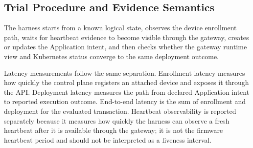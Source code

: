 \begingroup
\color{red}
\subsection{Trial Procedure and Evidence Semantics}
The harness starts from a known logical state, observes the device enrollment path, waits for heartbeat evidence to become visible through the gateway, creates or updates the Application intent, and then checks whether the gateway runtime view and Kubernetes status converge to the same deployment outcome.


Latency measurements follow the same separation. Enrollment latency measures how quickly the control plane registers an attached device and exposes it through the API.  Deployment latency measures the path from declared Application intent to reported execution outcome. End-to-end latency is the sum of enrollment and deployment for the evaluated transaction. Heartbeat observability is reported separately because it measures how quickly the harness can observe a fresh heartbeat after it is available through the gateway; it is not the firmware heartbeat period and should not be interpreted as a liveness interval.

